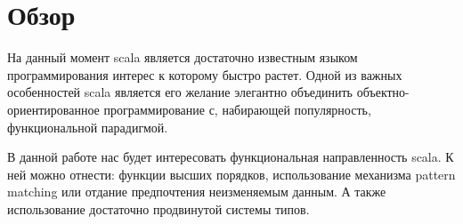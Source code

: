 \section{Обзор}
\label{overview}

На данный момент scala является достаточно известным языком программирования
интерес к которому быстро растет.
Одной из важных особенностей scala является его желание элегантно объединить
объектно-ориентированное программирование с, набирающей популярность,
функциональной парадигмой.

В данной работе нас будет интересовать функциональная направленность scala.
К ней можно отнести: функции высших порядков, использование механизма
pattern matching или отдание предпочтения неизменяемым данным.
А также использование достаточно продвинутой системы типов.

